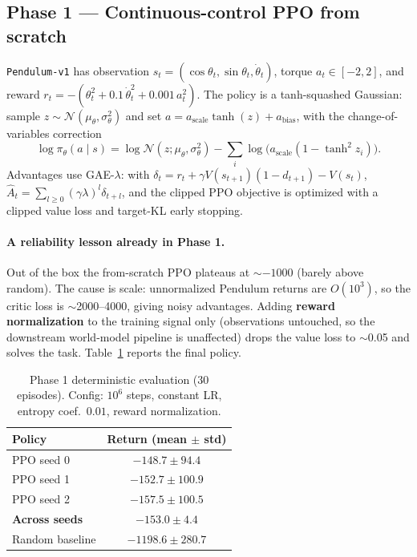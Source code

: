 \documentclass[11pt]{article}
\begin{document}
\subsection{Phase 1 --- Continuous-control PPO from scratch}
\texttt{Pendulum-v1} has observation $s_t=(\cos\theta_t,\sin\theta_t,\dot\theta_t)$, torque
$a_t\in[-2,2]$, and reward $r_t=-(\theta_t^2+0.1\,\dot\theta_t^2+0.001\,a_t^2)$. The policy is a
tanh-squashed Gaussian: sample $z\sim\mathcal{N}(\mu_\theta,\sigma_\theta^2)$ and set
$a=a_{\mathrm{scale}}\tanh(z)+a_{\mathrm{bias}}$, with the change-of-variables correction
\begin{equation}
\log\pi_\theta(a\mid s)=\log\mathcal{N}(z;\mu_\theta,\sigma_\theta^2)-\sum_i\log\!\big(a_{\mathrm{scale}}(1-\tanh^2 z_i)\big).
\end{equation}
Advantages use GAE-$\lambda$: with $\delta_t=r_t+\gamma V(s_{t+1})(1-d_{t+1})-V(s_t)$,
$\hat A_t=\sum_{l\ge0}(\gamma\lambda)^l\delta_{t+l}$, and the clipped PPO objective is optimized with a
clipped value loss and target-KL early stopping.

\paragraph{A reliability lesson already in Phase 1.} Out of the box the from-scratch PPO plateaus at
$\sim{-}1000$ (barely above random). The cause is scale: unnormalized Pendulum returns are $O(10^3)$, so
the critic loss is $\sim$2000--4000, giving noisy advantages. Adding \textbf{reward normalization} to the
training signal only (observations untouched, so the downstream world-model pipeline is unaffected) drops
the value loss to $\sim$0.05 and solves the task. Table~\ref{tab:ppo} reports the final policy.

\begin{table}[h]
\centering
\caption{Phase 1 deterministic evaluation (30 episodes). Config: $10^6$ steps, constant LR,
entropy coef.\ $0.01$, reward normalization.}
\label{tab:ppo}
\begin{tabular}{lc}
\toprule
Policy & Return (mean $\pm$ std)\\
\midrule
PPO seed 0 & $-148.7 \pm 94.4$\\
PPO seed 1 & $-152.7 \pm 100.9$\\
PPO seed 2 & $-157.5 \pm 100.5$\\
\textbf{Across seeds} & $\mathbf{-153.0 \pm 4.4}$\\
Random baseline & $-1198.6 \pm 280.7$\\
\bottomrule
\end{tabular}
\end{table}
\end{document}
